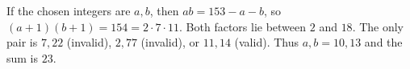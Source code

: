 If the chosen integers are $a,b$, then $ab=153-a-b$, so $(a+1)(b+1)=154=2\cdot7\cdot11$. Both factors lie between $2$ and $18$. The only pair is $7,22$ (invalid), $2,77$ (invalid), or $11,14$ (valid). Thus $a,b=10,13$ and the sum is $\boxed{23}$.
